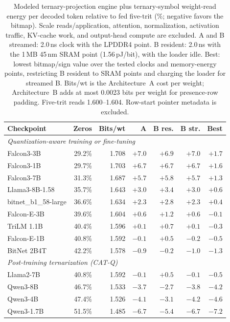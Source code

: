 \documentclass[11pt]{article}
\begin{document}
\begin{table}[t]
\centering
\small
\begin{tabular}{lrrrrrr}
\toprule
Checkpoint & Zeros & Bits/wt & A & B res. & B str. & Best \\
\midrule
\multicolumn{7}{l}{\emph{Quantization-aware training or fine-tuning}} \\
Falcon3-3B & 29.2\% & 1.708 & $+7.0$ & $+6.9$ & $+7.0$ & $+1.7$ \\
Falcon3-1B & 29.7\% & 1.703 & $+6.7$ & $+6.7$ & $+6.7$ & $+1.6$ \\
Falcon3-7B & 31.3\% & 1.687 & $+5.7$ & $+5.8$ & $+5.7$ & $+1.3$ \\
Llama3-8B-1.58 & 35.7\% & 1.643 & $+3.0$ & $+3.4$ & $+3.0$ & $+0.6$ \\
bitnet\_b1\_58-large & 36.6\% & 1.634 & $+2.3$ & $+2.8$ & $+2.3$ & $+0.4$ \\
Falcon-E-3B & 39.6\% & 1.604 & $+0.6$ & $+1.2$ & $+0.6$ & $-0.1$ \\
TriLM 1.1B & 40.4\% & 1.596 & $+0.1$ & $+0.7$ & $+0.1$ & $-0.3$ \\
Falcon-E-1B & 40.8\% & 1.592 & $-0.1$ & $+0.5$ & $-0.2$ & $-0.5$ \\
BitNet 2B4T & 42.2\% & 1.578 & $-0.9$ & $-0.2$ & $-1.0$ & $-1.3$ \\
\midrule
\multicolumn{7}{l}{\emph{Post-training ternarization (CAT-Q)}} \\
Llama2-7B & 40.8\% & 1.592 & $-0.1$ & $+0.5$ & $-0.1$ & $-0.5$ \\
Qwen3-8B & 46.7\% & 1.533 & $-3.7$ & $-2.7$ & $-3.8$ & $-4.2$ \\
Qwen3-4B & 47.4\% & 1.526 & $-4.1$ & $-3.1$ & $-4.2$ & $-4.6$ \\
Qwen3-1.7B & 51.5\% & 1.485 & $-6.7$ & $-5.4$ & $-6.7$ & $-7.2$ \\
\bottomrule
\end{tabular}
\caption{Modeled ternary-projection engine plus ternary-symbol weight-read energy per decoded token relative to fed
five-trit (\%; negative favors the bitmap). Scale reads/application, attention, normalization, activation traffic, KV-cache work, and output-head compute are excluded. A and B streamed: 2.0\,ns clock
with the LPDDR4 point. B resident: 2.0\,ns
with the 1\,MB 45\,nm SRAM point (1.56\,pJ/bit), with the loader idle. Best:
lowest bitmap/sign value over the tested clocks and memory-energy points, restricting B
resident to SRAM points and charging the loader for streamed B. Bits/wt is
the Architecture~A cost per weight; Architecture~B adds at most 0.0023 bits per weight for presence-row padding. Five-trit reads 1.600--1.604. Row-start
pointer metadata is excluded.}
\label{tab:system}
\end{table}
\end{document}
